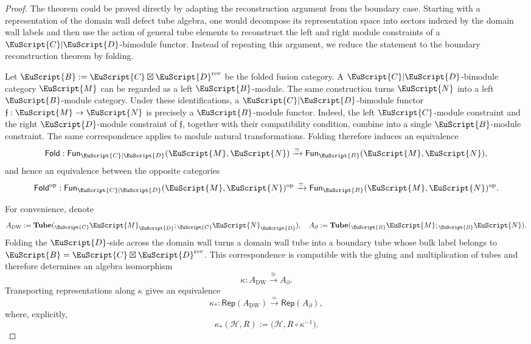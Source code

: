 \documentclass[a4paper,11pt]{article}
\theoremstyle{definition}
\theoremstyle{remark}
\newcommand\eB           {\EuScript{B}}
\newcommand\eC           {\EuScript{C}}
\newcommand\eD           {\EuScript{D}}
\newcommand\eM          {\EuScript{M}}
\newcommand\eN         {\EuScript{N}}
\newcommand{\Rep}{\mathsf{Rep}}
\newcommand{\Tube}{\mathbf{Tube}}
\newcommand{\Fun}{\mathsf{Fun}}
\begin{document}
\begin{proof}
The theorem could be proved directly by adapting the reconstruction argument from the boundary case. Starting with a representation of the domain wall defect tube algebra, one would decompose its representation space into sectors indexed by the domain wall labels and then use the action of general tube elements to reconstruct the left and right module constraints of a $\eC|\eD$-bimodule functor. Instead of repeating this argument, we reduce the statement to the boundary reconstruction theorem by folding.

Let $\eB:=\eC\boxtimes\eD^{\mathrm{rev}}$ be the folded fusion category. A $\eC|\eD$-bimodule category $\eM$ can be regarded as a left $\eB$-module. The same construction turns $\eN$ into a left $\eB$-module category. Under these identifications, a $\eC|\eD$-bimodule functor $\mathfrak f:\eM\to\eN$ is precisely a $\eB$-module functor. Indeed, the left $\eC$-module constraint and the right $\eD$-module constraint of $\mathfrak f$, together with their compatibility condition, combine into a single $\eB$-module constraint. The same correspondence applies to module natural transformations. Folding therefore induces an equivalence
\begin{equation*}
    \mathsf{Fold}:\Fun_{\eC|\eD}(\eM,\eN)\xrightarrow{\simeq}\Fun_{\eB}(\eM,\eN),
\end{equation*}
and hence an equivalence between the opposite categories
\begin{equation*}
    \mathsf{Fold}^{\mathrm{op}}:\Fun_{\eC|\eD}(\eM,\eN)^{\mathrm{op}}\xrightarrow{\simeq}\Fun_{\eB}(\eM,\eN)^{\mathrm{op}}.
\end{equation*}

For convenience, denote
\begin{equation*}
    A_{\mathrm{DW}}:=\Tube({}_\eC\eM_\eD;{}_\eC\eN_\eD),\quad A_{\partial} := \Tube({}_\eB\eM;{}_\eB\eN).
\end{equation*}
Folding the $\eD$-side across the domain wall turns a domain wall tube into a boundary tube whose bulk label belongs to $\eB=\eC\boxtimes\eD^{\mathrm{rev}}$. This correspondence is compatible with the gluing and multiplication of tubes and therefore determines an algebra isomorphism
\begin{equation*}
    \kappa: A_{\mathrm{DW}} \xrightarrow{\cong} A_{\partial}.
\end{equation*}
Transporting representations along $\kappa$ gives an equivalence
\begin{equation*}
    \kappa_*: \Rep(A_{\mathrm{DW}}) \xrightarrow{\simeq} \Rep(A_{\partial}),
\end{equation*}
where, explicitly,
\begin{equation*}
    \kappa_*(\mathcal H,R) := \bigl(\mathcal H,R\circ\kappa^{-1}\bigr).
\end{equation*}


\end{proof}
\end{document}
